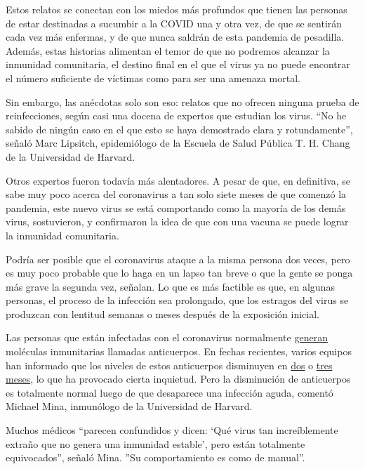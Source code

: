 Estos relatos se conectan con los miedos más profundos que tienen las
personas de estar destinadas a sucumbir a la COVID una y otra vez, de
que se sentirán cada vez más enfermas, y de que nunca saldrán de esta
pandemia de pesadilla. Además, estas historias alimentan el temor de que
no podremos alcanzar la inmunidad comunitaria, el destino final en el
que el virus ya no puede encontrar el número suficiente de víctimas como
para ser una amenaza mortal.

Sin embargo, las anécdotas solo son eso: relatos que no ofrecen ninguna
prueba de reinfecciones, según casi una docena de expertos que estudian
los virus. ``No he sabido de ningún caso en el que esto se haya
demostrado clara y rotundamente'', señaló Marc Lipsitch, epidemiólogo de
la Escuela de Salud Pública T. H. Chang de la Universidad de Harvard.

Otros expertos fueron todavía más alentadores. A pesar de que, en
definitiva, se sabe muy poco acerca del coronavirus a tan solo siete
meses de que comenzó la pandemia, este nuevo virus se está comportando
como la mayoría de los demás virus, sostuvieron, y confirmaron la idea
de que con una vacuna se puede lograr la inmunidad comunitaria.

Podría ser posible que el coronavirus ataque a la misma persona dos
veces, pero es muy poco probable que lo haga en un lapso tan breve o que
la gente se ponga más grave la segunda vez, señalan. Lo que es más
factible es que, en algunas personas, el proceso de la infección sea
prolongado, que los estragos del virus se produzcan con lentitud semanas
o meses después de la exposición inicial.

Las personas que están infectadas con el coronavirus normalmente
\href{https://www.nature.com/articles/s41586-020-2456-9}{generan}
moléculas inmunitarias llamadas anticuerpos. En fechas recientes, varios
equipos han informado que los niveles de estos anticuerpos disminuyen en
\href{https://www.medrxiv.org/content/10.1101/2020.07.09.20149633v1?\%253fcollection=}{dos}
o \href{https://www.nature.com/articles/s41591-020-0965-6}{tres meses},
lo que ha provocado cierta inquietud. Pero la disminución de anticuerpos
es totalmente normal luego de que desaparece una infección aguda,
comentó Michael Mina, inmunólogo de la Universidad de Harvard.

Muchos médicos ``parecen confundidos y dicen: `Qué virus tan
increíblemente extraño que no genera una inmunidad estable', pero están
totalmente equivocados'', señaló Mina. ''Su comportamiento es como de
manual''.

